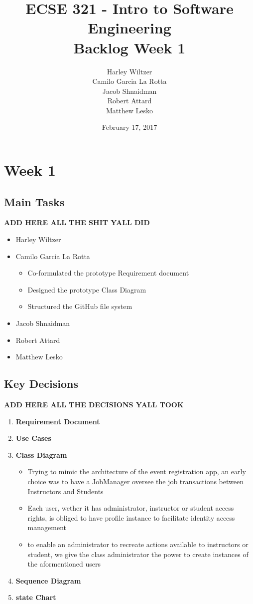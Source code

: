 \documentclass[12pt]{article}
\title{ECSE 321 - Intro to Software Engineering\\Backlog Week 1}
\author{Harley Wiltzer\\Camilo Garcia La Rotta\\Jacob Shnaidman\\Robert Attard\\Matthew Lesko}
\date{February 17, 2017}
\begin{document}
\maketitle
\newpage
{} %

\section{Week 1}

\subsection{Main Tasks}

\textbf{ADD HERE ALL THE SHIT YALL DID}

\begin{itemize}
    \item Harley Wiltzer
    \item Camilo Garcia La Rotta
    \begin{itemize}
        \item Co-formulated the prototype Requirement document
        \item Designed the prototype Class Diagram
        \item Structured the GitHub file system
    \end{itemize}
    \item Jacob Shnaidman
    \item Robert Attard
    \item Matthew Lesko
\end{itemize}

\subsection{Key Decisions}

\textbf{ADD HERE ALL THE DECISIONS YALL TOOK}

\begin{enumerate}
    \item \textbf{Requirement Document}
    \item \textbf{Use Cases}
    \item \textbf{Class Diagram}
    \begin{itemize}
        \item Trying to mimic the architecture of the event registration app, an early choice was to have a JobManager oversee the job transactions between Instructors and Students
        \item Each user, wether it has administrator, instructor or student access rights, is obliged to have profile instance to facilitate identity access management
        \item to enable an administrator to recreate actions available to instructors or student, we give the class administrator the power to create instances of the aformentioned users
    \end{itemize}
    \item \textbf{Sequence Diagram}
    \item \textbf{state Chart}
\end{enumerate}
\end{document}
